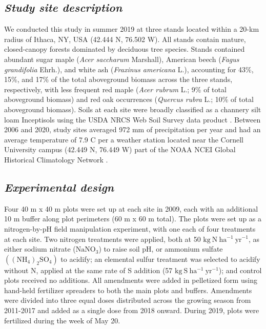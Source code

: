 \subsection{\textit{Study site description}}
We conducted this study in summer 2019 at three stands located within a 20-km radius of Ithaca, NY, USA (42.444 \textdegree{}N, 76.502 \textdegree{}W). All stands contain mature, closed-canopy forests dominated by deciduous tree species. Stands contained abundant sugar maple (\textit{Acer saccharum} Marshall), American beech (\textit{Fagus grandifolia} Ehrh.), and white ash (\textit{Fraxinus americana} L.), accounting for 43\%, 15\%, and 17\% of the total aboveground biomass across the three stands, respectively, with less frequent red maple (\textit{Acer rubrum} L.; 9\% of total aboveground biomass) and red oak occurrences (\textit{Quercus rubra} L.; 10\% of total aboveground biomass). Soils at each site were broadly classified as a channery silt loam Inceptisols using the USDA NRCS Web Soil Survey data product . Between 2006 and 2020, study sites averaged 972 mm of precipitation per year and had an average temperature of 7.9 \textdegree{}C per a weather station located near the Cornell University campus (42.449 \textdegree{}N, 76.449 \textdegree{}W) part of the NOAA NCEI Global Historical Climatology Network .


\subsection{\textit{Experimental design}}
Four 40 m x 40 m plots were set up at each site in 2009, each with an additional 10 m buffer along plot perimeters (60 m x 60 m total). The plots were set up as a nitrogen-by-pH field manipulation experiment, with one each of four treatments at each site. Two nitrogen treatments were applied, both at 50 $\mathrm{kg\ N\ ha^{-1}\ yr^{-1}}$, as either sodium nitrate ($\mathrm{NaNO_3}$) to raise soil pH, or ammonium sulfate $\mathrm{((NH_4)_{2}SO_4)}$ to acidify; an elemental sulfur treatment was selected to acidify without N, applied at the same rate of S addition (57 $\mathrm{kg\ S\ ha^{-1}\ yr^{-1}}$); and control plots received no additions. All amendments were added in pelletized form using hand-held fertilizer spreaders to both the main plots and buffers. Amendments were divided into three equal doses distributed across the growing season from 2011-2017 and added as a single dose from 2018 onward. During 2019, plots were fertilized during the week of May 20.

